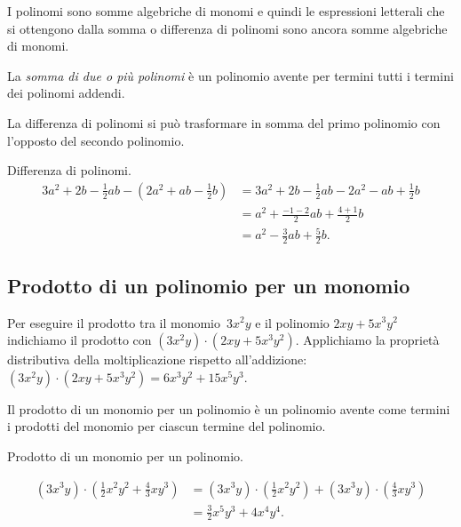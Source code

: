 I polinomi sono somme algebriche di monomi e quindi le espressioni 
letterali che si ottengono dalla somma
o differenza di polinomi sono ancora somme algebriche di monomi.

\begin{definizione}
La \emph{somma di due o più polinomi} è un polinomio avente per termini 
tutti i termini dei polinomi addendi.
\end{definizione}

La differenza di polinomi si può trasformare in somma del primo polinomio 
con l'opposto del secondo polinomio.

\begin{esempio}
Differenza di polinomi.
\begin{equation*}
\begin{split}
3a^2+2b-\frac{1}{2}ab-\left(2a^2+ab-\frac{1}{2}b\right)&=3a^2+2b-\frac{1}{2}
ab-2a^2-ab+\frac{1}{2}b\\
&=a^2+\frac{-1-2}{2}ab+\frac{4+1}{2}b\\
&=a^2-\frac{3}{2}ab+\frac{5}{2}b.
\end{split}
\end{equation*}
\end{esempio}


\subsection{Prodotto di un polinomio per un monomio}
\label{subsec:10_poli_prodottopermonomio}

Per eseguire il prodotto tra il monomio~\(3x^{2}y\) e il polinomio
\(2{xy}+5x^{3}y^{2}\) indichiamo il prodotto con
\(\left(3x^{2}y\right)\cdot \left(2{xy}+5x^{3}y^{2}\right)\).
Applichiamo la proprietà distributiva della moltiplicazione rispetto
all'addizione:~\(\left(3x^{2}y\right)\cdot
\left(2{xy}+5x^{3}y^{2}\right)=6x^{3}y^{2}+15x^{5}y^{3}\).

\osservazione Il prodotto di un monomio per un polinomio è
un polinomio avente come termini i prodotti del monomio per ciascun
termine del polinomio.

 \begin{esempio}
 Prodotto di un monomio per un polinomio.

 \begin{equation*}
\begin{split}
\left(3x^{3}y\right)\cdot\left(\frac{1}{2}x^{2}y^{2}+\frac{4}{3}{xy}^{3}
\right)&=\left(3x^{3}y\right)\cdot\left(\frac{1}{2}x^{2}y^{2}
\right)+\left(3x^{3}y\right)\cdot%
\left(\frac{4}{3}{xy}^{3}\right)\\
&=\frac{3}{2}x^{5}y^{3}+4x^{4}y^{4}.
\end{split}
\end{equation*}
 \end{esempio}

